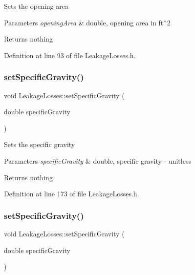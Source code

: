 Sets the opening area


\begin{DoxyParams}{Parameters}
{\em opening\+Area} & double, opening area in ft$^\wedge$2\\
\hline
\end{DoxyParams}
\begin{DoxyReturn}{Returns}
nothing 
\end{DoxyReturn}


Definition at line 93 of file Leakage\+Losses.\+h.

\mbox{\label{class_leakage_losses_ab017828413655c5903374564e8718fac}} 
\subsubsection{\texorpdfstring{set\+Specific\+Gravity()}{setSpecificGravity()}\hspace{0.1cm}{\footnotesize\ttfamily [1/3]}}
{\footnotesize\ttfamily void Leakage\+Losses\+::set\+Specific\+Gravity (\begin{DoxyParamCaption}\item[{double}]{specific\+Gravity }\end{DoxyParamCaption})\hspace{0.3cm}{\ttfamily [inline]}}

Sets the specific gravity


\begin{DoxyParams}{Parameters}
{\em specific\+Gravity} & double, specific gravity -\/ unitless\\
\hline
\end{DoxyParams}
\begin{DoxyReturn}{Returns}
nothing 
\end{DoxyReturn}


Definition at line 173 of file Leakage\+Losses.\+h.

\mbox{\label{class_leakage_losses_ab017828413655c5903374564e8718fac}} 
\subsubsection{\texorpdfstring{set\+Specific\+Gravity()}{setSpecificGravity()}\hspace{0.1cm}{\footnotesize\ttfamily [2/3]}}
{\footnotesize\ttfamily void Leakage\+Losses\+::set\+Specific\+Gravity (\begin{DoxyParamCaption}\item[{double}]{specific\+Gravity }\end{DoxyParamCaption})\hspace{0.3cm}{\ttfamily [inline]}}

